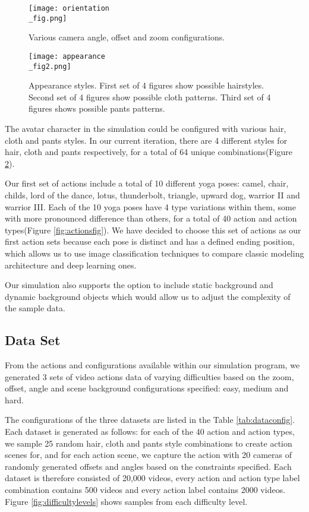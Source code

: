 \documentclass[
	a4paper, %
	10pt, %
	unnumberedsections, %
	twoside, %
]{t0004}
\begin{document}
\begin{figure}
	\texttt{[image: orientation\\\_fig.png]}
	\caption{Various camera angle, offset and zoom configurations.}
	\label{fig:orientationfig}
\end{figure}

\begin{figure}
	\texttt{[image: appearance\\\_fig2.png]}
	\caption{Appearance styles. First set of 4 figures show possible hairstyles. Second set of 4 figures show possible cloth patterns. Third set of 4 figures shows possible pants patterns.}
	\label{fig:appearancefig}
\end{figure}

The avatar character in the simulation could be configured with various hair, cloth and pants styles. In our current iteration, there are 4 different styles for hair, cloth and pants respectively, for a total of 64 unique combinations(Figure \ref{fig:appearancefig}).

Our first set of actions include a total of 10 different yoga poses: camel, chair, childs, lord of the dance, lotus, thunderbolt, triangle, upward dog, warrior II and warrior III. Each of the 10 yoga poses have 4 type variations within them, some with more pronounced difference than others, for a total of 40 action and action types(Figure \ref{fig:actionsfig}). We have decided to choose this set of actions as our first action sets because each pose is distinct and has a defined ending position, which allows us to use image classification techniques to compare classic modeling architecture and deep learning ones.

Our simulation also supports the option to include static background and dynamic background objects which would allow us to adjust the complexity of the sample data.

\subsection{Data Set}

From the actions and configurations available within our simulation program, we generated 3 sets of video actions data of varying difficulties based on the zoom, offset, angle and scene background configurations specified: easy, medium and hard.

The configurations of the three datasets are listed in the Table \ref{tab:dataconfig}. Each dataset is generated as follows: for each of the 40 action and action types, we sample 25 random hair, cloth and pants style combinations to create action scenes for, and for each action scene, we capture the action with 20 cameras of randomly generated offsets and angles based on the constraints specified. Each dataset is therefore consisted of 20,000 videos, every action and action type label combination contains 500 videos and every action label contains 2000 videos. Figure \ref{fig:difficultylevels} shows samples from each difficulty level.
\end{document}
